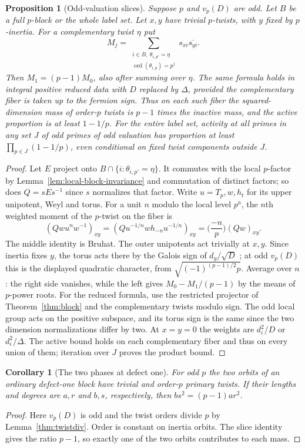 \documentclass[11pt,a4paper]{article}
\numberwithin{equation}{section}
\newtheorem{proposition}[theorem]{Proposition}
\newtheorem{corollary}[theorem]{Corollary}
\theoremstyle{remark}
\DeclareMathOperator{\ord}{ord}
\begin{document}
\begin{proposition}[Odd-valuation slices]\label{prop:odd-slice}
Suppose $p$ and $v_p(D)$ are odd. Let $B$ be a full $p$-block or the whole label set. Let $x,y$ have trivial $p$-twists, with $y$ fixed by $p$-inertia. For a complementary twist $\eta$ put
\[
 M_j=\sum_{\substack{i\in B,\ \theta_{i,p'}=\eta\\
                 \ord(\theta_{i,p})=p^j}}s_{xi}\overline{s_{yi}}.
\]
Then $M_1=(p-1)M_0$, also after summing over $\eta$. The same formula
holds in integral positive reduced data with $D$ replaced by $\Delta$,
provided the complementary fiber is taken up to the fermion sign. Thus on each such fiber the squared-dimension mass of order-$p$ twists is $p-1$ times the inactive mass, and the active proportion is at least $1-1/p$. For the entire label set, activity at all primes in any set $J$ of odd primes of odd valuation has proportion at least $\prod_{p\in J}(1-1/p)$, even conditional on fixed twist components outside $J$.
\end{proposition}
\begin{proof}
Let $E$ project onto $B\cap\{i:\theta_{i,p'}=\eta\}$. It commutes with the local $p$-factor by Lemma~\ref{lem:local-block-invariance} and commutation of distinct factors; so does $Q=sEs^{-1}$ since $s$ normalizes that factor. Write $u=T_p,w,h_t$ for its upper unipotent, Weyl and torus. For a unit $n$ modulo the local level $p^a$, the $n$th weighted moment of the $p$-twist on the fiber is
\[
 (Qwu^nw^{-1})_{xy}=(Qu^{-1/n}wh_{-n}u^{-1/n})_{xy}
 =\Big(\frac{-n}{p}\Big)(Qw)_{xy}.
\]
The middle identity is Bruhat. The outer unipotents act trivially at $x,y$. Since inertia fixes $y$, the torus acts there by the Galois sign of $d_y/\sqrt D$ \cite[Theorem~II and Remark~4.5]{DLNCongruence}; at odd $v_p(D)$ this is the displayed quadratic character, from $\sqrt{(-1)^{(p-1)/2}p}$. Average over $n$: the right side vanishes, while the left gives $M_0-M_1/(p-1)$ by the means of $p$-power roots. For the reduced formula, use the restricted projector of
Theorem~\ref{thm:block} and the complementary twists modulo sign.
The odd local group acts on the positive subspace, and its torus sign
is the same since the two dimension normalizations differ by two.
At $x=y=0$ the weights are $d_i^2/D$ or $d_i^2/\Delta$. The active bound holds on each complementary fiber and thus on every union of them; iteration over $J$ proves the product bound.
\end{proof}

\begin{corollary}[The two phases at defect one]\label{fam:M:3.9}
For odd $p$ the two orbits of an ordinary defect-one block have trivial and order-$p$ primary twists. If their lengths and degrees are $a,r$ and $b,s$, respectively, then $bs^2=(p-1)ar^2$.
\end{corollary}\begin{proof}
Here $v_p(D)$ is odd and the twist orders divide $p$ by Lemma~\ref{thm:twistdiv}. Order is constant on inertia orbits. The slice identity gives the ratio $p-1$, so exactly one of the two orbits contributes to each mass.
\end{proof}
\end{document}
